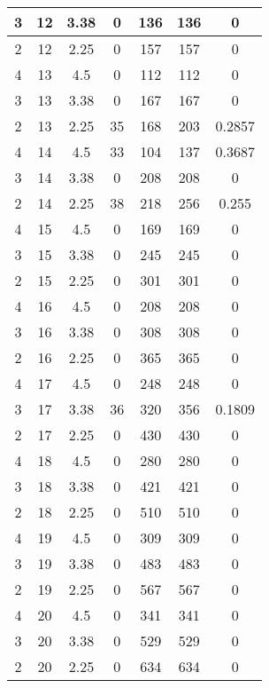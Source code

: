 \documentclass[letterpaper, 12pt]{article}
\begin{document}
\begin{longtable}{|c|c|c|c|c|c|c|}
\hline
3 & 12 & 3.38 & 0 & 136 & 136 & 0 \\
\hline
2 & 12 & 2.25 & 0 & 157 & 157 & 0 \\
\hline
4 & 13 & 4.5 & 0 & 112 & 112 & 0 \\
\hline
3 & 13 & 3.38 & 0 & 167 & 167 & 0 \\
\hline
2 & 13 & 2.25 & 35 & 168 & 203 & 0.2857 \\
\hline
4 & 14 & 4.5 & 33 & 104 & 137 & 0.3687 \\
\hline
3 & 14 & 3.38 & 0 & 208 & 208 & 0 \\
\hline
2 & 14 & 2.25 & 38 & 218 & 256 & 0.255 \\
\hline
4 & 15 & 4.5 & 0 & 169 & 169 & 0 \\
\hline
3 & 15 & 3.38 & 0 & 245 & 245 & 0 \\
\hline
2 & 15 & 2.25 & 0 & 301 & 301 & 0 \\
\hline
4 & 16 & 4.5 & 0 & 208 & 208 & 0 \\
\hline
3 & 16 & 3.38 & 0 & 308 & 308 & 0 \\
\hline
2 & 16 & 2.25 & 0 & 365 & 365 & 0 \\
\hline
4 & 17 & 4.5 & 0 & 248 & 248 & 0 \\
\hline
3 & 17 & 3.38 & 36 & 320 & 356 & 0.1809 \\
\hline
2 & 17 & 2.25 & 0 & 430 & 430 & 0 \\
\hline
4 & 18 & 4.5 & 0 & 280 & 280 & 0 \\
\hline
3 & 18 & 3.38 & 0 & 421 & 421 & 0 \\
\hline
2 & 18 & 2.25 & 0 & 510 & 510 & 0 \\
\hline
4 & 19 & 4.5 & 0 & 309 & 309 & 0 \\
\hline
3 & 19 & 3.38 & 0 & 483 & 483 & 0 \\
\hline
2 & 19 & 2.25 & 0 & 567 & 567 & 0 \\
\hline
4 & 20 & 4.5 & 0 & 341 & 341 & 0 \\
\hline
3 & 20 & 3.38 & 0 & 529 & 529 & 0 \\
\hline
2 & 20 & 2.25 & 0 & 634 & 634 & 0 \\
\hline
\end{longtable}
\end{document}
